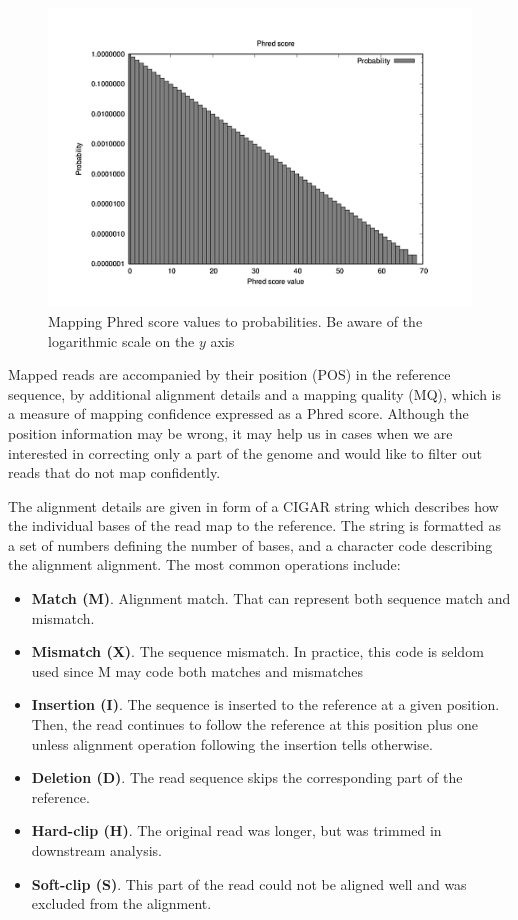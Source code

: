 \begin{figure}[h] 
	\centering 
	\includegraphics{img/quality-score.pdf} 
	\caption{Mapping Phred score values to probabilities. Be aware of the logarithmic scale on the $y$ axis} 
	\label{fig:quality-score} 
\end{figure} 


Mapped reads are accompanied by their position (POS) in the reference sequence, by additional alignment details and a mapping quality (MQ), which is a measure of mapping confidence expressed as a Phred score. Although the position information may be wrong, it may help us in cases when we are interested in correcting only a part of the genome and would like to filter out reads that do not map confidently. 

The alignment details are given in form of a CIGAR string which describes how the individual bases of the read map to the reference. The string is formatted as a set of numbers defining the number of bases, and a character code describing the alignment alignment. The most common operations include: 
\begin{itemize} 
\item \textbf{Match (M)}. Alignment match. That can represent both sequence match and mismatch. 
\item \textbf{Mismatch (X)}. The sequence mismatch. In practice, this code is seldom used since M may code both matches and mismatches 
\item \textbf{Insertion (I)}. The sequence is inserted to the reference at a given position. Then, the read continues to follow the reference at this position plus one unless alignment operation following the insertion tells otherwise. 
\item \textbf{Deletion (D)}. The read sequence skips the corresponding part of the reference. 
\item \textbf{Hard-clip (H)}. The original read was longer, but was trimmed in downstream analysis. 
\item \textbf{Soft-clip (S)}. This part of the read could not be aligned well and was excluded from the alignment. 
\end{itemize} 


